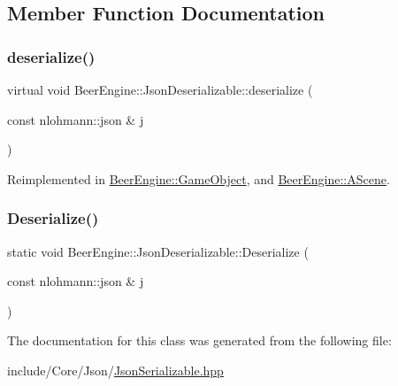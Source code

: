 \subsection{Member Function Documentation}
\mbox{\label{class_beer_engine_1_1_json_deserializable_ae1ce96bc441e544e7339641d80925726}} 
\subsubsection{\texorpdfstring{deserialize()}{deserialize()}}
{\footnotesize\ttfamily virtual void Beer\+Engine\+::\+Json\+Deserializable\+::deserialize (\begin{DoxyParamCaption}\item[{const nlohmann\+::json \&}]{j }\end{DoxyParamCaption})\hspace{0.3cm}{\ttfamily [virtual]}}



Reimplemented in \mbox{\hyperlink{class_beer_engine_1_1_game_object_a68a7f2c23d06d575e683705195821c87}{Beer\+Engine\+::\+Game\+Object}}, and \mbox{\hyperlink{class_beer_engine_1_1_a_scene_a3db491adb7ff57a3a527024fd0a6001f}{Beer\+Engine\+::\+A\+Scene}}.

\mbox{\label{class_beer_engine_1_1_json_deserializable_af4c5582f75eb96988c5d4ff546218e1e}} 
\subsubsection{\texorpdfstring{Deserialize()}{Deserialize()}}
{\footnotesize\ttfamily static void Beer\+Engine\+::\+Json\+Deserializable\+::\+Deserialize (\begin{DoxyParamCaption}\item[{const nlohmann\+::json \&}]{j }\end{DoxyParamCaption})\hspace{0.3cm}{\ttfamily [static]}}



The documentation for this class was generated from the following file\+:\begin{DoxyCompactItemize}
\item 
include/\+Core/\+Json/\mbox{\hyperlink{_json_serializable_8hpp}{Json\+Serializable.\+hpp}}\end{DoxyCompactItemize}
